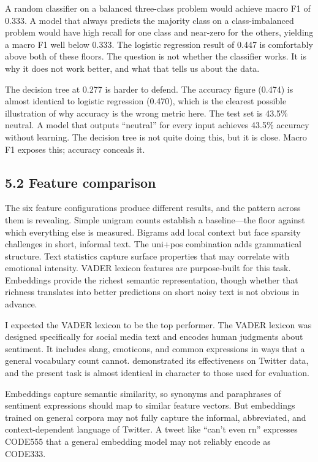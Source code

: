\documentclass[12pt]{article}
\begin{document}
A random classifier on a balanced three-class problem would achieve macro F1 of 0.333. A model that always predicts the majority class on a class-imbalanced problem would have high recall for one class and near-zero for the others, yielding a macro F1 well below 0.333. The logistic regression result of 0.447 is comfortably above both of these floors. The question is not whether the classifier works. It is why it does not work better, and what that tells us about the data.



The decision tree at 0.277 is harder to defend. The accuracy figure (0.474) is almost identical to logistic regression (0.470), which is the clearest possible illustration of why accuracy is the wrong metric here. The test set is 43.5\% neutral. A model that outputs ``neutral'' for every input achieves 43.5\% accuracy without learning. The decision tree is not quite doing this, but it is close. Macro F1 exposes this; accuracy conceals it.



\subsection*{5.2 Feature comparison}



The six feature configurations produce different results, and the pattern across them is revealing. Simple unigram counts establish a baseline—the floor against which everything else is measured. Bigrams add local context but face sparsity challenges in short, informal text. The uni+pos combination adds grammatical structure. Text statistics capture surface properties that may correlate with emotional intensity. VADER lexicon features are purpose-built for this task. Embeddings provide the richest semantic representation, though whether that richness translates into better predictions on short noisy text is not obvious in advance.



I expected the VADER lexicon to be the top performer. The VADER lexicon was designed specifically for social media text and encodes human judgments about sentiment. It includes slang, emoticons, and common expressions in ways that a general vocabulary count cannot. \citet{hutto2014vader} demonstrated its effectiveness on Twitter data, and the present task is almost identical in character to those used for evaluation.



Embeddings capture semantic similarity, so synonyms and paraphrases of sentiment expressions should map to similar feature vectors. But embeddings trained on general corpora may not fully capture the informal, abbreviated, and context-dependent language of Twitter. A tweet like ``can't even rn'' expresses CODE555 that a general embedding model may not reliably encode as CODE333.
\end{document}
